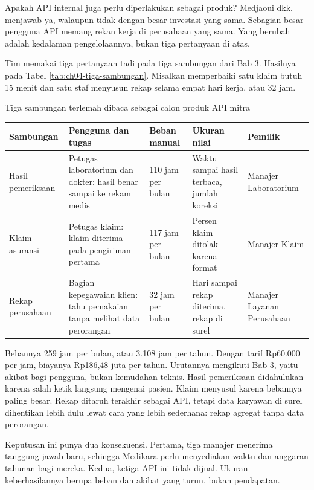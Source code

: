 Apakah API internal juga perlu diperlakukan sebagai produk? Medjaoui dkk. menjawab ya, walaupun tidak
dengan besar investasi yang sama. Sebagian besar pengguna API memang rekan kerja di perusahaan yang
sama. Yang berubah adalah kedalaman pengelolaannya, bukan tiga pertanyaan di atas.

\begin{kasus}[title={Kasus Medikara Health: Tiga Sambungan Terlemah sebagai Calon Produk}]
Tim memakai tiga pertanyaan tadi pada tiga sambungan dari Bab 3. Hasilnya pada Tabel
\ref{tab:ch04-tiga-sambungan}. Misalkan memperbaiki satu klaim butuh 15 menit dan satu staf menyusun
rekap selama empat hari kerja, atau 32 jam.

\begin{center}
  \begin{minipage}{\linewidth}
    \captionsetup{type=table}
    \caption{Tiga sambungan terlemah dibaca sebagai calon produk API mitra}
    \label{tab:ch04-tiga-sambungan}
    \footnotesize
    \begin{tabularx}{\linewidth}{K{1.7cm}JK{1.3cm}JK{1.6cm}}
      \hline
      \textbf{Sambungan} & \textbf{Pengguna dan tugas} & \textbf{Beban manual} & \textbf{Ukuran nilai} & \textbf{Pemilik} \\ \hline
      Hasil pemeriksaan & Petugas laboratorium dan dokter: hasil benar sampai ke rekam medis & 110 jam per bulan & Waktu sampai hasil terbaca, jumlah koreksi & Manajer Laboratorium \\ \hline
      Klaim asuransi & Petugas klaim: klaim diterima pada pengiriman pertama & 117 jam per bulan & Persen klaim ditolak karena format & Manajer Klaim \\ \hline
      Rekap perusahaan & Bagian kepegawaian klien: tahu pemakaian tanpa melihat data perorangan & 32 jam per bulan & Hari sampai rekap diterima, rekap di surel & Manajer Layanan Perusahaan \\ \hline
    \end{tabularx}
  \end{minipage}
\end{center}

Bebannya 259 jam per bulan, atau 3.108 jam per tahun. Dengan tarif Rp60.000 per jam, biayanya Rp186,48
juta per tahun. Urutannya mengikuti Bab 3, yaitu akibat bagi pengguna, bukan kemudahan teknis. Hasil
pemeriksaan didahulukan karena salah ketik langsung mengenai pasien. Klaim menyusul karena bebannya
paling besar. Rekap ditaruh terakhir sebagai API, tetapi data karyawan di surel dihentikan lebih dulu
lewat cara yang lebih sederhana: rekap agregat tanpa data perorangan.

Keputusan ini punya dua konsekuensi. Pertama, tiga manajer menerima tanggung jawab baru, sehingga
Medikara perlu menyediakan waktu dan anggaran tahunan bagi mereka. Kedua, ketiga API ini tidak dijual.
Ukuran keberhasilannya berupa beban dan akibat yang turun, bukan pendapatan.
\end{kasus}


